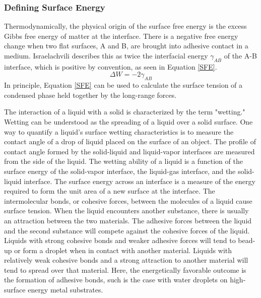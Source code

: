 
\subsubsection{Defining Surface Energy}\label{define-surf-energy}


 Thermodynamically, the physical origin of the surface free energy is the excess Gibbs free energy of matter at the interface. There is a negative free energy change when two flat surfaces, A and B, are brought into adhesive contact in a medium. Israelachvili describes this as twice the interfacial energy $ \gamma_{AB} $ of the A-B interface, which is positive by convention,\cite{Israelachvili2011n} as seen in Equation \ref{SFE}.
\begin{equation}\label{SFE}
	\Delta W = -2\gamma_{AB}
\end{equation}
 In principle, Equation \ref{SFE} can be used to calculate the surface tension of a condensed phase held together by the long-range forces. 

 The interaction of a liquid with a solid is characterized by the term "wetting." Wetting can be understood as the spreading of a liquid over a solid surface. One way to quantify a liquid's surface wetting characteristics is to measure the contact angle of a drop of liquid placed on the surface of an object. The profile of contact angle formed by the solid-liquid and liquid-vapor interfaces are measured from the side of the liquid. 
 The wetting ability of a liquid is a function of the surface energy of the solid-vapor interface, the liquid-gas interface, and the solid-liquid interface. The surface energy across an interface is a measure of the energy required to form the unit area of a new surface at the interface. The intermolecular bonds, or cohesive forces, between the molecules of a liquid cause surface tension. When the liquid encounters another substance, there is usually an attraction between the two materials. The adhesive forces between the liquid and the second substance will compete against the cohesive forces of the liquid.  Liquids with strong cohesive bonds and weaker adhesive forces will tend to bead-up or form a droplet when in contact with another material. Liquids with relatively weak cohesive bonds and a strong attraction to another material will tend to spread over that material. Here, the energetically favorable outcome is the formation of adhesive bonds, such is the case with water droplets on high-surface energy metal substrates.
 
